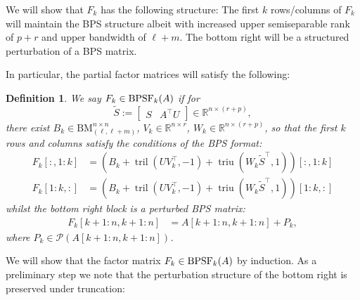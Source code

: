\documentclass[a4paper,fleqn]{cas-sc}
\newtheorem{definition}{Definition}
\def\bbR{{\mathbb R}}
\def\calP{{\mathcal P}}
\DeclareMathOperator{\triu}{triu}
\DeclareMathOperator{\tril}{tril}
\begin{document}
We will show that $F_k$ has the following structure:
The first $k$ rows/columns of $F_k$ will maintain the BPS structure albeit with increased upper semiseparable rank of $p+r$ and upper bandwidth of $\ell+m$. The bottom right will be a structured perturbation of a BPS matrix.

In particular,
the partial factor matrices will satisfy the following:

\begin{definition}
We say $F_k \in {\rm BPSF}_k(A)$ if for
\[
\tilde S :=  \begin{bmatrix} S & A^\top U
\end{bmatrix} \in \bbR^{n \times (r+p)},
\]
 there exist 
 $B_k \in {\mathrm{BM}}_{(\ell,\ell+m)}^{n \times n}$,
$V_k \in \bbR^{n \times r}$, $W_k \in \bbR^{n \times (r+p)}$, 
so that the first $k$ rows and columns satisfy the conditions of the BPS format:
\begin{align*}
F_k[:,1\!:\!k] &= (B_k + \tril(U V_k^\top, -1) + \triu(W_k \tilde S^\top,1))[:,1\!:\!k] \\
F_k[1\!:\!k,:] &= (B_k + \tril(U V_k^\top, -1) + \triu(W_k \tilde S^\top,1))[1\!:\!k,:]
\end{align*}
whilst the bottom right block is a perturbed BPS matrix:
\begin{align*}
F_k[k\!+\!1\!:\!n,k\!+\!1\!:\!n] &= A[k+1\!:\!n,k+1\!:\!n] + P_k,
\end{align*}
where $P_k \in \calP(A[k+1\!:\!n,k+1\!:\!n])$.
\end{definition}


We will show that the factor matrix $F_k \in {\rm BPSF}_k(A)$ by induction.
As a preliminary step we note that the perturbation structure of the bottom right is preserved under truncation:
\end{document}

